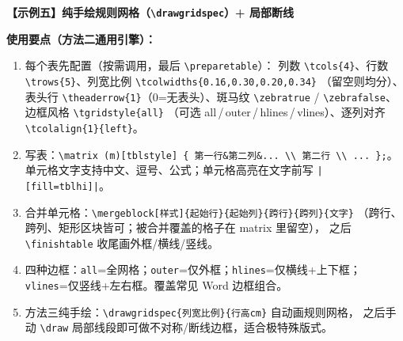 \documentclass[zihao=-4,a4paper]{ctexart}
\def\tcfgcols{4}
\def\tcfgrows{5}
\def\tcfgcolwidths{}
\def\tcfgtablew{\textwidth}
\def\tcfgheaderrow{1}
\def\tcfggridstyle{all}
\def\tcfgminrow{0.72cm}
\newif\ifzebra\zebratrue
\newcommand{\tcols}[1]{\def\tcfgcols{#1}}
\newcommand{\trows}[1]{\def\tcfgrows{#1}}
\newcommand{\tcolwidths}[1]{\def\tcfgcolwidths{#1}}
\newcommand{\theaderrow}[1]{\def\tcfgheaderrow{#1}}
\newcommand{\tgridstyle}[1]{\def\tcfggridstyle{#1}}
\newcommand{\tcolalign}[2]{\expandafter\def\csname tca#1\endcsname{#2}}
\newcommand{\tcaget}[1]{\ifcsname tca#1\endcsname\csname tca#1\endcsname\else center\fi}
\newcommand{\preparetable}{%
  \ifx\tcfgcolwidths\empty
    \edef\cwsum{\tcfgcols}%
  \else
    \xdef\cwsum{0}%
    \foreach \w in \tcfgcolwidths {%
      \pgfmathsetmacro{\cwsumnew}{\cwsum+\w}%
      \xdef\cwsum{\cwsumnew}%
    }%
  \fi
  \ifx\tcfgcolwidths\empty
    \foreach \i in {1,...,\tcfgcols} {%
      \pgfmathparse{1/\cwsum*\the\tcfgtablew}%
      \expandafter\xdef\csname cw\i\endcsname{\pgfmathresult}%
    }%
  \else
    \foreach[count=\i] \w in \tcfgcolwidths {%
      \pgfmathparse{\w/\cwsum*\the\tcfgtablew}%
      \expandafter\xdef\csname cw\i\endcsname{\pgfmathresult}%
    }%
  \fi
  \ifdefstring{\tcfggridstyle}{all}{\def\griddraw{, draw, line width=0.5pt}}{\def\griddraw{}}%
  \gdef\tblmatrixopts{%
    matrix of nodes, nodes in empty cells, inner sep=0pt, outer sep=0pt,
    column sep=0pt, row sep=0pt,
    nodes={align=center, inner sep=4pt, font=\small, minimum height=\tcfgminrow\griddraw}%
  }%
  \foreach \i in {1,...,\tcfgcols} {%
    \xdef\tblmatrixopts{\unexpanded\expandafter{\tblmatrixopts}, column \i/.style={text width=\csname cw\i\endcsname pt, align=\tcaget{\i}}}%
  }%
  \ifnum\tcfgheaderrow>0
    \xdef\tblmatrixopts{\unexpanded\expandafter{\tblmatrixopts}, row \tcfgheaderrow/.style={nodes={fill=tblhead}}}%
  \fi
  \ifzebra
    \foreach \r in {1,...,\tcfgrows} {%
      \ifnum\r>\tcfgheaderrow
        \ifodd\r\relax\else
          \xdef\tblmatrixopts{\unexpanded\expandafter{\tblmatrixopts}, row \r/.style={nodes={fill=tblrow}}}%
        \fi
      \fi
    }%
  \fi
  \xdef\tblstyle{\noexpand\tikzset{tblstyle/.style={\tblmatrixopts}}}\tblstyle%
}
\newcommand{\mergeblock}[6][fill=white, draw=black, line width=0.5pt]{%
  \pgfmathtruncatemacro{\rB}{#2+#4-1}%
  \pgfmathtruncatemacro{\cB}{#3+#5-1}%
  \node[fit=(m-#2-#3)(m-\rB-\cB), inner sep=0pt, #1, align=center, font=\small] {#6};
}
\newcommand{\finishtable}{%
  \ifdefstring{\tcfggridstyle}{all}{%
    \draw[line width=1pt] (m-1-1.north west) rectangle (m-\tcfgrows-\tcfgcols.south east);
  }{}%
  \ifdefstring{\tcfggridstyle}{outer}{%
    \draw[line width=1pt] (m-1-1.north west) rectangle (m-\tcfgrows-\tcfgcols.south east);
  }{}%
  \ifdefstring{\tcfggridstyle}{hlines}{%
    \draw[line width=1pt] (m-1-1.north west) -- (m-1-\tcfgcols.north east);
    \draw[line width=1pt] (m-\tcfgrows-1.south west) -- (m-\tcfgrows-\tcfgcols.south east);
    \foreach \r in {1,...,\tcfgrows} {%
      \ifnum\r<\tcfgrows
        \draw[line width=0.5pt] (m-\r-1.south west) -- (m-\r-\tcfgcols.south east);
      \fi
    }%
  }{}%
  \ifdefstring{\tcfggridstyle}{vlines}{%
    \draw[line width=1pt] (m-1-1.north west) -- (m-\tcfgrows-1.south west);
    \draw[line width=1pt] (m-1-\tcfgcols.north east) -- (m-\tcfgrows-\tcfgcols.south east);
    \foreach \c in {1,...,\tcfgcols} {%
      \ifnum\c<\tcfgcols
        \draw[line width=0.5pt] (m-1-\c.north east) -- (m-\tcfgrows-\c.south east);
      \fi
    }%
  }{}%
}
\newcommand{\drawgridspec}[2]{%
  \xdef\gsum{0}%
  \foreach \w in {#1}{%
    \pgfmathsetmacro{\gsumnew}{\gsum+\w}%
    \xdef\gsum{\gsumnew}%
  }%
  \xdef\gxone{0}\pgfmathsetmacro{\gxacc}{0}%
  \foreach[count=\gi] \w in {#1}{%
    \pgfmathparse{\gxacc+\w/\gsum*\the\tcfgtablew}%
    \expandafter\xdef\csname gx\the\numexpr\gi+1\endcsname{\pgfmathresult}%
    \xdef\gxacc{\pgfmathresult}%
    \xdef\gcols{\gi}%
  }%
  \xdef\gyone{0}\pgfmathsetmacro{\gyacc}{0}%
  \foreach[count=\gj] \h in {#2}{%
    \pgfmathparse{\gyacc-\h*28.4527}%
    \expandafter\xdef\csname gy\the\numexpr\gj+1\endcsname{\pgfmathresult}%
    \xdef\gyacc{\pgfmathresult}%
    \xdef\grows{\gj}%
  }%
  \draw[line width=1pt] (\gxone pt,\gyone pt)
        rectangle (\csname gx\the\numexpr\gcols+1\endcsname pt,\csname gy\the\numexpr\grows+1\endcsname pt);
  \foreach \k in {2,...,\gcols}{%
    \draw[line width=0.5pt] (\csname gx\k\endcsname pt,\gyone pt)
          -- (\csname gx\k\endcsname pt,\csname gy\the\numexpr\grows+1\endcsname pt);
  }%
  \foreach \l in {2,...,\grows}{%
    \draw[line width=0.5pt] (\gxone pt,\csname gy\l\endcsname pt)
          -- (\csname gx\the\numexpr\gcols+1\endcsname pt,\csname gy\l\endcsname pt);
  }%
}
\begin{document}
\noindent\textbf{【示例五】纯手绘规则网格（\texttt{\textbackslash drawgridspec}）+ 局部断线}

\begin{center}
\end{center}

\noindent\small\textbf{使用要点（方法二通用引擎）：}
\begin{enumerate}[label=\arabic*.]
  \item 每个表先配置（按需调用，最后 \verb!\preparetable!）：
        列数 \verb!\tcols{4}!、行数 \verb!\trows{5}!、列宽比例 \verb!\tcolwidths{0.16,0.30,0.20,0.34}!
        （留空则均分）、表头行 \verb!\theaderrow{1}!（0=无表头）、斑马纹
        \verb!\zebratrue! / \verb!\zebrafalse!、边框风格 \verb!\tgridstyle{all}!
        （可选 all\,/\,outer\,/\,hlines\,/\,vlines）、逐列对齐 \verb!\tcolalign{1}{left}!。
  \item 写表：\verb!\matrix (m)[tblstyle] { 第一行&第二列&... \\ 第二行 \\ ... };!。
        单元格文字支持中文、逗号、公式；单元格高亮在文字前写 \verb!|[fill=tblhi]|!。
  \item 合并单元格：\verb!\mergeblock[样式]{起始行}{起始列}{跨行}{跨列}{文字}!
        （跨行、跨列、矩形区块皆可；被合并覆盖的格子在 matrix 里留空），
        之后 \verb!\finishtable! 收尾画外框/横线/竖线。
  \item 四种边框：\texttt{all}=全网格；\texttt{outer}=仅外框；\texttt{hlines}=仅横线+上下框；
        \texttt{vlines}=仅竖线+左右框。覆盖常见 Word 边框组合。
  \item 方法三纯手绘：\verb!\drawgridspec{列宽比例}{行高cm}! 自动画规则网格，
        之后手动 \verb!\draw! 局部线段即可做不对称/断线边框，适合极特殊版式。
\end{enumerate}
\end{document}
